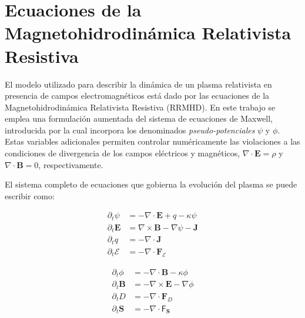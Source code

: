 \section{Ecuaciones de la Magnetohidrodinámica Relativista Resistiva}

El modelo utilizado para describir la dinámica de un plasma relativista en presencia de campos electromagnéticos está dado por las ecuaciones de la Magnetohidrodinámica Relativista Resistiva (RRMHD). En este trabajo se emplea una formulación aumentada del sistema de ecuaciones de Maxwell, introducida por \citep{Dedner_etal:2002} la cual incorpora los denominados \emph{pseudo-potenciales} $\psi$ y $\phi$. Estas variables adicionales permiten controlar numéricamente las violaciones a las condiciones de divergencia de los campos eléctricos y magnéticos, $\nabla \cdot \mathbf{E} = \rho$ y $\nabla \cdot \mathbf{B} = 0$, respectivamente.

El sistema completo de ecuaciones que gobierna la evolución del plasma se puede escribir como:
\begin{center}
\begin{minipage}{0.45\textwidth}
\begin{align*}
\partial_t \psi &= - \nabla \cdot \mathbf{E} + q - \kappa \psi \\[1.5ex]
\partial_t \mathbf{E} &= \nabla \times \mathbf{B} - \nabla \psi - \mathbf{J} \\[1.5ex]
\partial_t q &= - \nabla \cdot \mathbf{J} \\[1.5ex]
\partial_t \mathcal{E} &= - \nabla \cdot \mathbf{F}_{\mathcal{E}}
\end{align*}
\end{minipage}
\hfill
\begin{minipage}{0.45\textwidth}
\begin{align*}
\partial_t \phi &= - \nabla \cdot \mathbf{B} - \kappa \phi \\[1.5ex]
\partial_t \mathbf{B} &= - \nabla \times \mathbf{E} - \nabla \phi \\[1.5ex]
\partial_t D &= - \nabla \cdot \mathbf{F}_D \\[1.5ex]
\partial_t \mathbf{S} &= - \nabla \cdot \boldsymbol{\mathsf{F}}_{\mathbf{S}}
\end{align*}
\end{minipage}
\end{center}

